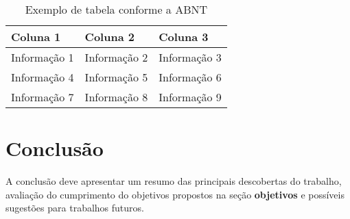 \begin{table}[h]
    \centering
    \caption{Exemplo de tabela conforme a ABNT}
    \label{quad:exemplo}
    \begin{tabular}{p{3cm} p{4cm} p{3cm}}
        \hline%
        \textbf{Coluna 1} & \textbf{Coluna 2} & \textbf{Coluna 3} \\
        \hline%
        Informação 1 & Informação 2 & Informação 3 \\
        Informação 4 & Informação 5 & Informação 6 \\
        Informação 7 & Informação 8 & Informação 9 \\
        \hline%
    \end{tabular}
\end{table}

\chapter{Conclusão} \label{ch:conclusao}

A conclusão deve apresentar um resumo das principais descobertas do trabalho, avaliação do cumprimento do objetivos propostos na seção \textbf{objetivos} e possíveis sugestões para trabalhos futuros.
